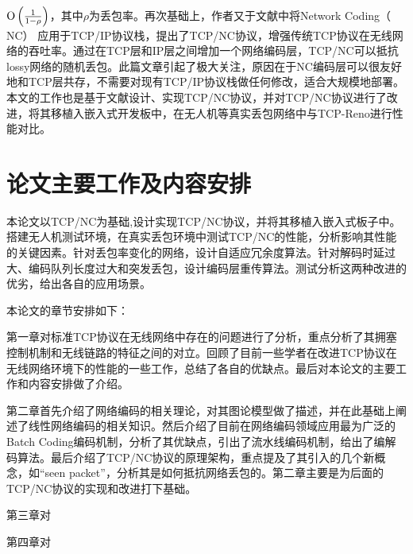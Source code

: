 ${\rm O}\left( {\frac{1}{{1{\rm{ - }}\rho }}} \right)$，其中$\rho$为丢包率。再次基础上，作者又于文献\cite{Sundararajan2009}中将Network Coding（ NC） 应用于TCP/IP协议栈，提出了TCP/NC协议，增强传统TCP协议在无线网络的吞吐率。通过在TCP层和IP层之间增加一个网络编码层，TCP/NC可以抵抗lossy网络的随机丢包。此篇文章引起了极大关注，原因在于NC编码层可以很友好地和TCP层共存，不需要对现有TCP/IP协议栈做任何修改，适合大规模地部署。本文的工作也是基于文献\cite{Sundararajan2009,Sundararajan2011}设计、实现TCP/NC协议，并对TCP/NC协议进行了改进，将其移植入嵌入式开发板中，在无人机等真实丢包网络中与TCP-Reno进行性能对比。

\section{论文主要工作及内容安排}
本论文以TCP/NC\textsuperscript{\cite{Sundararajan2009}}为基础,设计实现TCP/NC协议，并将其移植入嵌入式板子中。搭建无人机测试环境，在真实丢包环境中测试TCP/NC的性能，分析影响其性能的关键因素。针对丢包率变化的网络，设计自适应冗余度算法。针对解码时延过大、编码队列长度过大和突发丢包，设计编码层重传算法。测试分析这两种改进的优劣，给出各自的应用场景。
\par
本论文的章节安排如下：
\par
第一章对标准TCP协议在无线网络中存在的问题进行了分析，重点分析了其拥塞控制机制和无线链路的特征之间的对立。回顾了目前一些学者在改进TCP协议在无线网络环境下的性能的一些工作，总结了各自的优缺点。最后对本论文的主要工作和内容安排做了介绍。
\par
第二章首先介绍了网络编码的相关理论，对其图论模型做了描述，并在此基础上阐述了线性网络编码的相关知识。然后介绍了目前在网络编码领域应用最为广泛的Batch Coding编码机制，分析了其优缺点，引出了流水线编码机制，给出了编解码算法。最后介绍了TCP/NC协议的原理架构，重点提及了其引入的几个新概念，如“seen packet”，分析其是如何抵抗网络丢包的。第二章主要是为后面的TCP/NC协议的实现和改进打下基础。 
\par
第三章对
\par
第四章对

